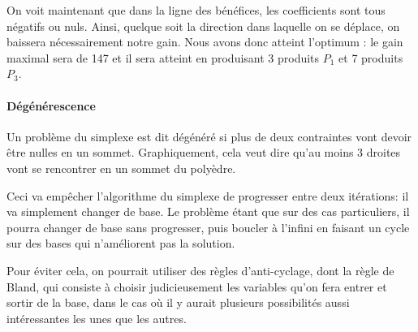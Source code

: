       On voit maintenant que dans la ligne des bénéfices, les coefficients sont
      tous négatifs ou nuls. Ainsi, quelque soit la direction dans laquelle on
      se déplace, on baissera nécessairement notre gain. Nous avons donc
      atteint l'optimum : le gain maximal sera de 147 et il sera atteint en
      produisant 3 produits $P_1$ et 7 produits $P_3$.



    \paragraph{Dégénérescence}
      Un problème du simplexe est dit dégénéré si plus de deux contraintes vont
      devoir être nulles en un sommet. Graphiquement, cela veut dire
      qu'au moins 3 droites vont se rencontrer en un sommet du polyèdre.

      Ceci va empêcher l'algorithme du simplexe de progresser entre deux
      itérations: il va simplement changer de base. Le problème étant que sur
      des cas particuliers, il pourra changer de base sans progresser, puis
      boucler à l'infini en faisant un cycle sur des bases qui n'améliorent pas
      la solution.

      Pour éviter cela, on pourrait utiliser des règles d'anti-cyclage, dont la
      règle de Bland, qui consiste à choisir judicieusement les variables qu'on
      fera entrer et sortir de la base, dans le cas où il y aurait plusieurs
      possibilités aussi intéressantes les unes que les autres.

